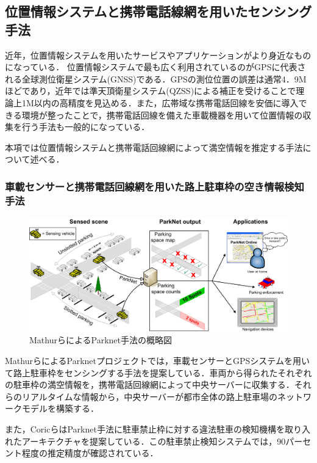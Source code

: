 \subsection{位置情報システムと携帯電話線網を用いたセンシング手法}

近年，位置情報システムを用いたサービスやアプリケーションがより身近なものになっている．
位置情報システムで最も広く利用されているのがGPSに代表される全球測位衛星システム(GNSS)である．GPSの測位位置の誤差は通常4．9Mほどであり\cite{gps-gov}，近年では準天頂衛星システム(QZSS)による補正を受けることで理論上1M以内の高精度を見込める\cite{michibiki}．また，広帯域な携帯電話回線を安価に導入できる環境が整ったことで，携帯電話回線を備えた車載機器を用いて位置情報の収集を行う手法も一般的になっている．


本項では位置情報システムと携帯電話回線網によって満空情報を推定する手法について述べる．

\subsubsection{車載センサーと携帯電話回線網を用いた路上駐車枠の空き情報検知手法}

\begin{figure}[htb]
	\centering
	\includegraphics[width=13cm]{fig/parknet.png}
	\caption{MathurらによるParknet手法の概略図 \protect \footnotemark}
	\label{parknet-fig}
\end{figure}
MathurらによるParknetプロジェクトでは，車載センサーとGPSシステムを用いて路上駐車枠をセンシングする手法を提案している\cite{Parknet}．車両から得られたそれぞれの駐車枠の満空情報を，携帯電話回線網によって中央サーバーに収集する．それらのリアルタイムな情報から，中央サーバーが都市全体の路上駐車場のネットワークモデルを構築する．


また，CoricらはParknet手法に駐車禁止枠に対する違法駐車の検知機構を取り入れたアーキテクチャを提案している\cite{Crowdsensing}．この駐車禁止検知システムでは，90パーセント程度の推定精度が確認されている．

